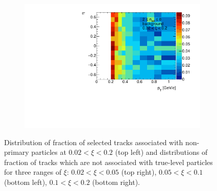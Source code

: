 \begin{figure}[h!]
\begin{subfigure}{.47\textwidth}
	\end{subfigure}
	\begin{subfigure}{.47\textwidth}
		\includegraphics[width=\linewidth, page=5]{chapters/chrgSTAR/img/chargedBkg/bkg2D.pdf}
	\end{subfigure}
	\caption[Distribution of fraction of selected tracks  associated with non-primary particles  at $0.02<\xi<0.2$ and distributions of fraction of tracks which are not associated with true-level particles for three ranges of $\xi$. ]{Distribution of fraction of selected tracks  associated with non-primary particles  at $0.02<\xi<0.2$ (top left) and distributions of fraction of tracks which are not associated with true-level particles for three ranges of $\xi$: $0.02<\xi<0.05$ (top right), $0.05<\xi<0.1$ (bottom left), $0.1<\xi<0.2$ (bottom right).  }
	\label{fig:bkg_fake_charged}
\end{figure}



